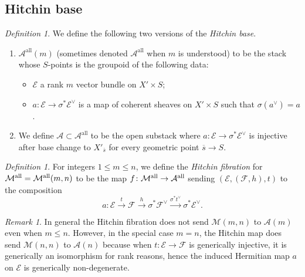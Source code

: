 \documentclass[reqno]{amsart}
\numberwithin{equation}{section}
\newcommand{\tony}[1]{{\color{blue} \sf
    $\spadesuit\spadesuit\spadesuit$ TONY: [#1]}}
\newcommand{\ol}[1]{\overline{#1}}
\newcommand{\Cal}[1]{\mathcal{#1}}
\newcommand{\co}{\colon}
\newcommand{\mrm}[1]{\mathrm{#1}}
\DeclareMathOperator{\GL}{GL}
\DeclareMathOperator{\all}{all}
\newcommand{\WZ}[1]{{\color{blue} {#1}}}
\newcommand\cA{\mathcal{A}}
\newcommand\cE{\mathcal{E}}
\newcommand\cF{\mathcal{F}}
\newcommand\cM{\mathcal{M}}
\theoremstyle{remark}
\newtheorem{remark}[thm]{Remark}
\newtheorem{defn}[thm]{Definition}
\numberwithin{equation}{section}
\begin{document}
\subsection{Hitchin base} \label{ss:Hit base}
\begin{defn} We define the following two versions of the \emph{Hitchin base}. 
\begin{enumerate}
\item $\cA^{\mrm{all}}(m)$ (sometimes denoted $\cA^{\mrm{\all}}$ when $m$ is understood) to be the stack whose $S$-points is the groupoid of the following data: 
\begin{itemize}
\item $\Cal{E}$ a rank $m$ vector bundle on $X'\times S$;
\item $a \co \Cal{E} \rightarrow \sigma^* \Cal{E}^{\vee}$ is a map of coherent sheaves on $X'\times S$ such that $\sigma(a^{\vee}) = a$.
\end{itemize}

\item We define $\cA \subset \cA^{\mrm{all}}$ to be the open substack where $a\co \Cal{E} \rightarrow \sigma^* \Cal{E}^{\vee}$ is injective after base change to $X'_{\ol{s}}$ for every geometric point $\ol{s} \rightarrow S$.
\end{enumerate}
\end{defn}

\begin{defn} For integers $1 \leq m \leq n$, we define the \emph{Hitchin fibration} for $\cM^{\rm all} = \cM^{\rm all}(m,n)$ to be the map $f \co \cM^{\rm all} \rightarrow \Cal{A}^{\mrm{all}}$ sending $(\Cal{E}, (\Cal{F},h), t)$ to
the composition 
\[
a\co \Cal{E} \xrightarrow{t} \Cal{F} \xrightarrow{h} \sigma^* \Cal{F}^{\vee} \xrightarrow{\sigma^* t^{\vee}} \sigma^* \Cal{E}^{\vee}.
\]	
\end{defn}



\begin{remark}\label{r:M to A}In general the Hitchin fibration does not send $\cM(m,n)$ to $\cA(m)$ even when $m\le n$. However, in the special case $m=n$,  the Hitchin map does send $\cM(n,n)$ to $\cA(n)$ because when $t:\cE\to \cF$ is generically injective, it is generically an isomorphism for rank reasons, hence the induced Hermitian map $a$ on $\cE$ is generically non-degenerate.
\end{remark}


\end{document}
